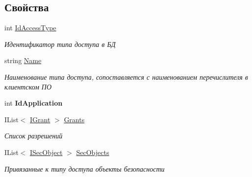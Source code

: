 \subsection*{Свойства}
\begin{DoxyCompactItemize}
\item 
int \hyperlink{interface_security_1_1_interfaces_1_1_model_1_1_i_access_type_a87940a53a901cc03f83ec53030a88085}{Id\+Access\+Type}
\begin{DoxyCompactList}\small\item\em Идентификатор типа доступа в БД \end{DoxyCompactList}\item 
string \hyperlink{interface_security_1_1_interfaces_1_1_model_1_1_i_access_type_aa8be0e16d6b2256ce78150b742149bfa}{Name}
\begin{DoxyCompactList}\small\item\em Наименование типа доступа, сопоставляется с наименованием перечислителя в клиентском ПО \end{DoxyCompactList}\item 
\mbox{\label{interface_security_1_1_interfaces_1_1_model_1_1_i_access_type_a54a86f65464f7fbbd4943377eb988b73}} 
int {\bfseries Id\+Application}
\item 
I\+List$<$ \hyperlink{interface_security_1_1_interfaces_1_1_model_1_1_i_grant}{I\+Grant} $>$ \hyperlink{interface_security_1_1_interfaces_1_1_model_1_1_i_access_type_aaf491bad6936ef7fb306fee95a7104ac}{Grants}
\begin{DoxyCompactList}\small\item\em Список разрешений \end{DoxyCompactList}\item 
I\+List$<$ \hyperlink{interface_security_1_1_interfaces_1_1_model_1_1_i_sec_object}{I\+Sec\+Object} $>$ \hyperlink{interface_security_1_1_interfaces_1_1_model_1_1_i_access_type_a75b1473ae6aa9a3746aa1ebb3b1d1489}{Sec\+Objects}
\begin{DoxyCompactList}\small\item\em Привязанные к типу доступа объекты безопасности \end{DoxyCompactList}\item 

\end{DoxyCompactItemize}
